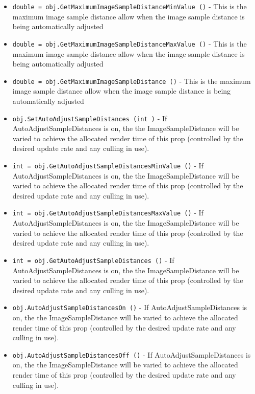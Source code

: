 \begin{itemize}
\item  \verb|double = obj.GetMaximumImageSampleDistanceMinValue ()| -  This is the maximum image sample distance allow when the image
 sample distance is being automatically adjusted

\item  \verb|double = obj.GetMaximumImageSampleDistanceMaxValue ()| -  This is the maximum image sample distance allow when the image
 sample distance is being automatically adjusted

\item  \verb|double = obj.GetMaximumImageSampleDistance ()| -  This is the maximum image sample distance allow when the image
 sample distance is being automatically adjusted

\item  \verb|obj.SetAutoAdjustSampleDistances (int )| -  If AutoAdjustSampleDistances is on, the the ImageSampleDistance
 will be varied to achieve the allocated render time of this 
 prop (controlled by the desired update rate and any culling in
 use). 

\item  \verb|int = obj.GetAutoAdjustSampleDistancesMinValue ()| -  If AutoAdjustSampleDistances is on, the the ImageSampleDistance
 will be varied to achieve the allocated render time of this 
 prop (controlled by the desired update rate and any culling in
 use). 

\item  \verb|int = obj.GetAutoAdjustSampleDistancesMaxValue ()| -  If AutoAdjustSampleDistances is on, the the ImageSampleDistance
 will be varied to achieve the allocated render time of this 
 prop (controlled by the desired update rate and any culling in
 use). 

\item  \verb|int = obj.GetAutoAdjustSampleDistances ()| -  If AutoAdjustSampleDistances is on, the the ImageSampleDistance
 will be varied to achieve the allocated render time of this 
 prop (controlled by the desired update rate and any culling in
 use). 

\item  \verb|obj.AutoAdjustSampleDistancesOn ()| -  If AutoAdjustSampleDistances is on, the the ImageSampleDistance
 will be varied to achieve the allocated render time of this 
 prop (controlled by the desired update rate and any culling in
 use). 

\item  \verb|obj.AutoAdjustSampleDistancesOff ()| -  If AutoAdjustSampleDistances is on, the the ImageSampleDistance
 will be varied to achieve the allocated render time of this 
 prop (controlled by the desired update rate and any culling in
 use). 


\end{itemize}
